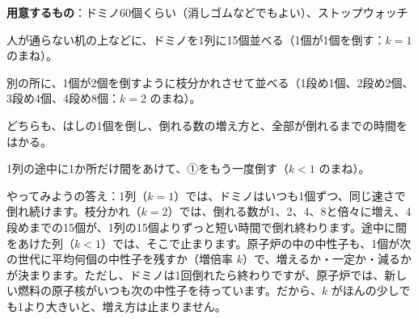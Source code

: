 \begin{yattemiyou}[ドミノで連鎖をまねしよう]
\textbf{用意するもの}：ドミノ60個くらい（消しゴムなどでもよい）、ストップウォッチ\par\vspace{2pt}
\noindent\begin{minipage}[c]{0.64\linewidth}
\begin{enumerate}[label={\bkcircled[bkGreen]{\arabic*}}, leftmargin=2.4\zw, itemsep=1pt, topsep=0pt]
\item 人が通らない机の上などに、ドミノを1列に15個並べる（1個が1個を倒す：$k=1$ のまね）。
\item 別の所に、1個が2個を倒すように枝分かれさせて並べる（1段め1個、2段め2個、3段め4個、4段め8個：$k=2$ のまね）。
\item どちらも、はしの1個を倒し、倒れる数の増え方と、全部が倒れるまでの時間をはかる。
\item 1列の途中に1か所だけ間をあけて、①をもう一度倒す（$k<1$ のまね）。
\end{enumerate}
\end{minipage}\hfill
\begin{minipage}[c]{0.33\linewidth}\centering
{}
\end{minipage}
\end{yattemiyou}

\noindent やってみようの答え：1列（$k=1$）では、ドミノはいつも1個ずつ、同じ速さで倒れ続けます。枝分かれ（$k=2$）では、倒れる数が1、2、4、8と倍々に増え、4段めまでの15個が、1列の15個よりずっと短い時間で倒れ終わります。途中に間をあけた列（$k<1$）では、そこで止まります。原子炉の中の中性子も、1個が次の世代に平均何個の中性子を残すか（増倍率 $k$）で、増えるか・一定か・減るかが決まります。ただし、ドミノは1回倒れたら終わりですが、原子炉では、新しい燃料の原子核がいつも次の中性子を待っています。だから、$k$ がほんの少しでも1より大きいと、増え方は止まりません。

